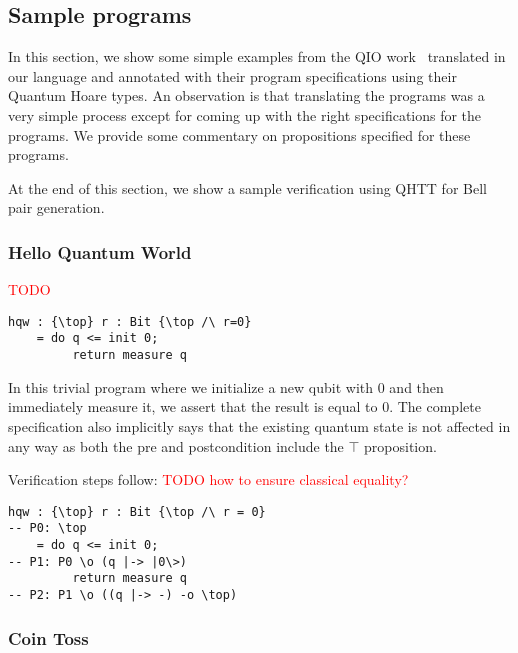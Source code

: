 \documentclass[acmsmall,nonacm,timestamp,review=false,anonymous=false]{acmart}
\newcommand{\todo}[1]{\textcolor{red}{#1}}
\begin{document}
\subsection{Sample programs}
\label{sec:examples}

In this section, we show some simple examples from the QIO work~\cite{qio} translated in our language and annotated with their program specifications using their Quantum Hoare types. An observation is that translating the programs was a very simple process except for coming up with the right specifications for the programs. We provide some commentary on propositions specified for these programs.

At the end of this section, we show a sample verification using QHTT for Bell pair generation.

\subsubsection{Hello Quantum World}
 \todo{TODO}
\leavevmode

\begin{minipage}{0.95\linewidth}
\begin{lstlisting}[language=QHaskell]
hqw : {\top} r : Bit {\top /\ r=0}
    = do q <= init 0;
         return measure q
\end{lstlisting}
\end{minipage}

In this trivial program where we initialize a new qubit with 0 and then immediately measure it, we assert that the result is equal to 0. The complete specification also implicitly says that the existing quantum state is not affected in any way as both the pre and postcondition include the $\top$ proposition.

Verification steps follow:  \todo{TODO how to ensure classical equality?}

\begin{minipage}{0.95\linewidth}
\begin{lstlisting}[language=QHaskell]
hqw : {\top} r : Bit {\top /\ r = 0}
-- P0: \top
    = do q <= init 0;
-- P1: P0 \o (q |-> |0\>)
         return measure q
-- P2: P1 \o ((q |-> -) -o \top)
\end{lstlisting}
\end{minipage}

\subsubsection{Coin Toss}
\leavevmode
\end{document}

